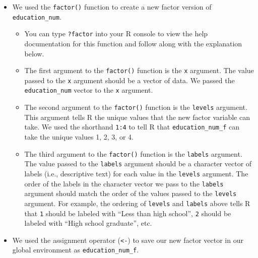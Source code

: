 \documentclass[
  letterpaper,
  DIV=11,
  numbers=noendperiod]{scrreprt}
\begin{document}
\begin{itemize}
\item
  We used the \texttt{factor()} function to create a new factor version
  of \texttt{education\_num}.

  \begin{itemize}
  \item
    You can type \texttt{?factor} into your R console to view the help
    documentation for this function and follow along with the
    explanation below.
  \item
    The first argument to the \texttt{factor()} function is the
    \texttt{x} argument. The value passed to the \texttt{x} argument
    should be a vector of data. We passed the \texttt{education\_num}
    vector to the \texttt{x} argument.
  \item
    The second argument to the \texttt{factor()} function is the
    \texttt{levels} argument. This argument tells R the unique values
    that the new factor variable can take. We used the shorthand
    \texttt{1:4} to tell R that \texttt{education\_num\_f} can take the
    unique values 1, 2, 3, or 4.
  \item
    The third argument to the \texttt{factor()} function is the
    \texttt{labels} argument. The value passed to the \texttt{labels}
    argument should be a character vector of labels (i.e., descriptive
    text) for each value in the \texttt{levels} argument. The order of
    the labels in the character vector we pass to the \texttt{labels}
    argument should match the order of the values passed to the
    \texttt{levels} argument. For example, the ordering of
    \texttt{levels} and \texttt{labels} above tells R that \texttt{1}
    should be labeled with ``Less than high school'', \texttt{2} should
    be labeled with ``High school graduate'', etc.
  \end{itemize}
\item
  We used the assignment operator (\texttt{\textless{}-}) to save our
  new factor vector in our global environment as
  \texttt{education\_num\_f}.


\end{itemize}
\end{document}
